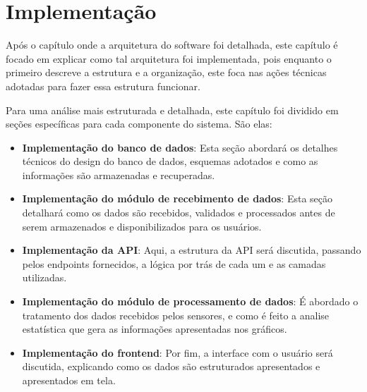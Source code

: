 \chapter{Implementação}\label{cap:implementation}

Após o capítulo onde a arquitetura do software foi detalhada, este capítulo é focado em explicar como tal arquitetura foi implementada, pois enquanto o primeiro descreve a estrutura e a organização, este foca nas ações técnicas adotadas para fazer essa estrutura funcionar.

Para uma análise mais estruturada e detalhada, este capítulo foi dividido em seções específicas para cada componente do sistema. São elas:

\begin{itemize}
    \item \textbf{Implementação do banco de dados}: Esta seção abordará os detalhes técnicos do design do banco de dados, esquemas adotados e como as informações são armazenadas e recuperadas.
    
    \item \textbf{Implementação do módulo de recebimento de dados}: Esta seção detalhará como os dados são recebidos, validados e processados antes de serem armazenados e disponibilizados para os usuários.
    
    \item \textbf{Implementação da API}: Aqui, a estrutura da API será discutida, passando pelos endpoints fornecidos, a lógica por trás de cada um e as camadas utilizadas.
    
    
    
    \item \textbf{Implementação do módulo de processamento de dados}: É abordado o tratamento dos dados recebidos pelos sensores, e como é feito a analise estatística que gera as informações apresentadas nos gráficos.
    
    \item \textbf{Implementação do frontend}: Por fim, a interface com o usuário será discutida, explicando como os dados são estruturados apresentados e apresentados em tela.
\end{itemize}




